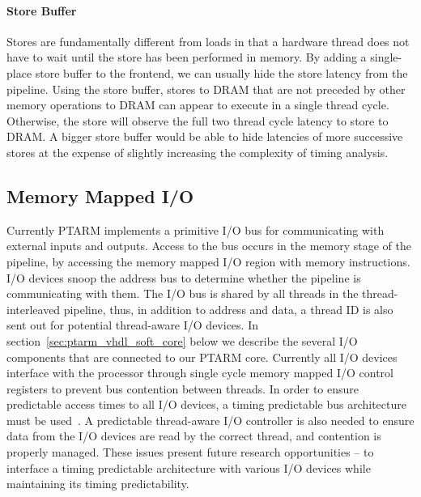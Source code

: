 \paragraph{Store Buffer}
\label{sec:ptarm_dram_store_buffer}
Stores are fundamentally different from loads in that a hardware thread does not have to wait until the store has been performed in memory.
By adding a single-place store buffer to the frontend, we can usually hide the store latency from the pipeline.
Using the store buffer, stores to DRAM that are not preceded by other memory operations to DRAM can appear to execute in a single thread cycle.
Otherwise, the store will observe the full two thread cycle latency to store to DRAM.
A bigger store buffer would be able to hide latencies of more successive stores at the expense of slightly increasing the complexity of timing analysis.

\subsection{Memory Mapped I/O}
Currently PTARM implements a primitive I/O bus for communicating with external inputs and outputs.
Access to the bus occurs in the memory stage of the pipeline, by accessing the memory mapped I/O region with memory instructions.
I/O devices snoop the address bus to determine whether the pipeline is communicating with them.
The I/O bus is shared by all threads in the thread-interleaved pipeline, thus, in addition to address and data, a thread ID is also sent out for potential thread-aware I/O devices. 
In section~\ref{sec:ptarm_vhdl_soft_core} below we describe the several I/O components that are connected to our PTARM core.
Currently all I/O devices interface with the processor through single cycle memory mapped I/O control registers to prevent bus contention between threads.
In order to ensure predictable access times to all I/O devices, a timing predictable bus architecture must be used~\cite{Wilhelm_future_arch_09}.   
A predictable thread-aware I/O controller is also needed to ensure data from the I/O devices are read by the correct thread, and contention is properly managed.
These issues present future research opportunities -- to interface a timing predictable architecture with various I/O devices while maintaining its timing predictability.  

